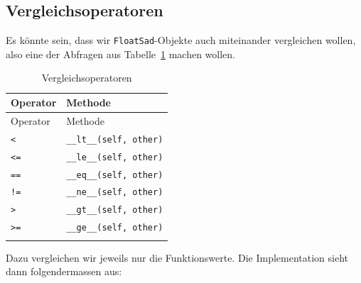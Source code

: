 \documentclass[
  a4paper,
  DIV=11]{scrreprt}
\theoremstyle{definition}
\theoremstyle{definition}
\theoremstyle{remark}
\begin{document}
\hypertarget{vergleichsoperatoren}{%
\subsection{Vergleichsoperatoren}\label{vergleichsoperatoren}}

Es könnte sein, dass wir \texttt{FloatSad}-Objekte auch miteinander
vergleichen wollen, also eine der Abfragen aus
Tabelle~\ref{tbl-Vergleichsmethoden} machen wollen.

\hypertarget{tbl-Vergleichsmethoden}{}
\begin{longtable}[]{@{}ll@{}}
\toprule\noalign{}
Operator & Methode \\
\midrule\noalign{}
\endfirsthead
\toprule\noalign{}
Operator & Methode \\
\midrule\noalign{}
\endhead
\bottomrule\noalign{}
\endlastfoot
\texttt{\textless{}} & \texttt{\_\_lt\_\_(self,\ other)} \\
\texttt{\textless{}=} & \texttt{\_\_le\_\_(self,\ other)} \\
\texttt{==} & \texttt{\_\_eq\_\_(self,\ other)} \\
\texttt{!=} & \texttt{\_\_ne\_\_(self,\ other)} \\
\texttt{\textgreater{}} & \texttt{\_\_gt\_\_(self,\ other)} \\
\texttt{\textgreater{}=} & \texttt{\_\_ge\_\_(self,\ other)} \\
\caption{\label{tbl-Vergleichsmethoden}Vergleichsoperatoren}\tabularnewline
\end{longtable}

Dazu vergleichen wir jeweils nur die Funktionswerte. Die Implementation
sieht dann folgendermassen aus:
\end{document}

